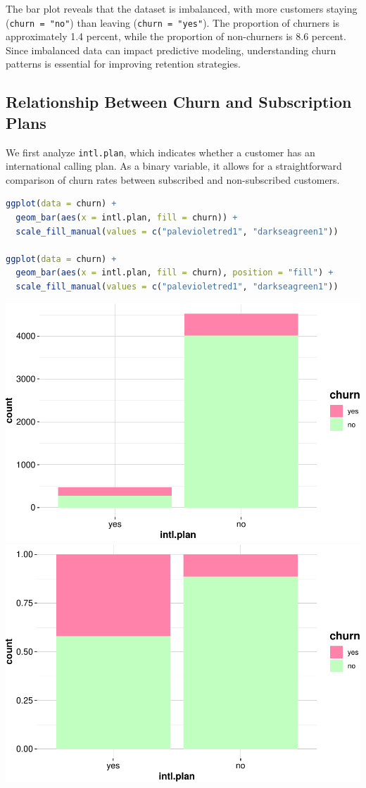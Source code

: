 \documentclass[
]{book}
\newcommand{\passthrough}[1]{#1}
\theoremstyle{definition}
\theoremstyle{definition}
\theoremstyle{definition}
\theoremstyle{definition}
\theoremstyle{remark}
\begin{document}
The bar plot reveals that the dataset is imbalanced, with more customers staying (\passthrough{\lstinline!churn = "no"!}) than leaving (\passthrough{\lstinline!churn = "yes"!}). The proportion of churners is approximately 1.4 percent, while the proportion of non-churners is 8.6 percent. Since imbalanced data can impact predictive modeling, understanding churn patterns is essential for improving retention strategies.

\subsection*{Relationship Between Churn and Subscription Plans}\label{relationship-between-churn-and-subscription-plans}

We first analyze \passthrough{\lstinline!intl.plan!}, which indicates whether a customer has an international calling plan. As a binary variable, it allows for a straightforward comparison of churn rates between subscribed and non-subscribed customers.

\begin{lstlisting}[language=R]
ggplot(data = churn) + 
  geom_bar(aes(x = intl.plan, fill = churn)) +
  scale_fill_manual(values = c("palevioletred1", "darkseagreen1")) 

ggplot(data = churn) + 
  geom_bar(aes(x = intl.plan, fill = churn), position = "fill") +
  scale_fill_manual(values = c("palevioletred1", "darkseagreen1")) 
\end{lstlisting}

\includegraphics[width=0.5\linewidth]{EDA_files/figure-latex/unnamed-chunk-5-1} \includegraphics[width=0.5\linewidth]{EDA_files/figure-latex/unnamed-chunk-5-2}
\end{document}
